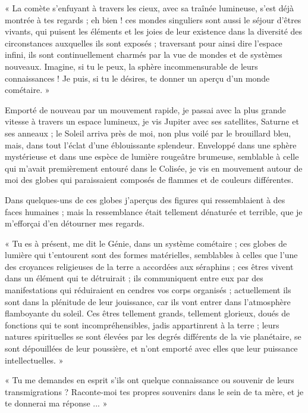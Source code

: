 \documentclass[a4paper, 11pt, oneside]{article}
\begin{document}
« La comète s'enfuyant à travers les cieux, avec sa traînée lumineuse, s'est déjà montrée à tes regards ; eh bien ! ces mondes singuliers sont aussi le séjour d'êtres vivants, qui puisent les éléments et les joies de leur existence dans la diversité des circonstances auxquelles ils sont exposés ; traversant pour ainsi dire l'espace infini, ils sont continuellement charmés par la vue de mondes et de systèmes nouveaux. Imagine, si tu le peux, la sphère incommensurable de leurs connaissances ! Je puis, si tu le désires, te donner un aperçu d'un monde cométaire. »

Emporté de nouveau par un mouvement rapide, je passai avec la plus grande vitesse à travers un espace lumineux, je vis Jupiter avec ses satellites, Saturne et ses anneaux ; le Soleil arriva près de moi, non plus voilé par le brouillard bleu, mais, dans tout l'éclat d'une éblouissante splendeur. Enveloppé dans une sphère mystérieuse et dans une espèce de lumière rougeâtre brumeuse, semblable à celle qui m'avait premièrement entouré dans le Colisée, je vis en mouvement autour de moi des globes qui paraissaient composés de flammes et de couleurs différentes.

Dans quelques-uns de ces globes j'aperçus des figures qui ressemblaient à des faces humaines ; mais la ressemblance était tellement dénaturée et terrible, que je m'efforçai d'en détourner mes regards.

« Tu es à présent, me dit le Génie, dans un système cométaire ; ces globes de lumière qui t'entourent sont des formes matérielles, semblables à celles que l'une des croyances religieuses de la terre a accordées aux séraphins ; ces êtres vivent dans un élément qui te détruirait ; ils communiquent entre eux par des manifestations qui réduiraient en cendres vos corps organisés ; actuellement ils sont dans la plénitude de leur jouissance, car ils vont entrer dans l'atmosphère flamboyante du soleil. Ces êtres tellement grands, tellement glorieux, doués de fonctions qui te sont incompréhensibles, jadis appartinrent à la terre ; leurs natures spirituelles se sont élevées par les degrés différents de la vie planétaire, se sont dépouillées de leur poussière, et n'ont emporté avec elles que leur puissance intellectuelles. »

« Tu me demandes en esprit s'ils ont quelque connaissance ou souvenir de leurs transmigrations ? Raconte-moi tes propres souvenirs dans le sein de ta mère, et je te donnerai ma réponse ... »
\end{document}
